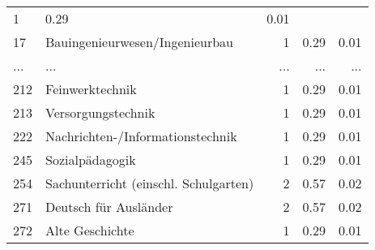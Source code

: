 \begin{longtable}{lXrrr}
          \num{1} &
          \num[round-mode=places,round-precision=2]{0,29} &
          \num[round-mode=places,round-precision=2]{0,01} \\
        17 & \multicolumn{1}{X}{Bauingenieurwesen/Ingenieurbau} & %
          \num{1} &
          \num[round-mode=places,round-precision=2]{0,29} &
          \num[round-mode=places,round-precision=2]{0,01} \\
       ... & ... & ... & ... & ... \\
        212 & \multicolumn{1}{X}{Feinwerktechnik} & %
          \num{1} &
          \num[round-mode=places,round-precision=2]{0,29} &
          \num[round-mode=places,round-precision=2]{0,01} \\

        213 & \multicolumn{1}{X}{Versorgungstechnik} & %
          \num{1} &
          \num[round-mode=places,round-precision=2]{0,29} &
          \num[round-mode=places,round-precision=2]{0,01} \\

        222 & \multicolumn{1}{X}{Nachrichten-/Informationstechnik} & %
          \num{1} &
          \num[round-mode=places,round-precision=2]{0,29} &
          \num[round-mode=places,round-precision=2]{0,01} \\

        245 & \multicolumn{1}{X}{Sozialpädagogik} & %
          \num{1} &
          \num[round-mode=places,round-precision=2]{0,29} &
          \num[round-mode=places,round-precision=2]{0,01} \\

        254 & \multicolumn{1}{X}{Sachunterricht (einschl. Schulgarten)} & %
          \num{2} &
          \num[round-mode=places,round-precision=2]{0,57} &
          \num[round-mode=places,round-precision=2]{0,02} \\

        271 & \multicolumn{1}{X}{Deutsch für Ausländer} & %
          \num{2} &
          \num[round-mode=places,round-precision=2]{0,57} &
          \num[round-mode=places,round-precision=2]{0,02} \\

        272 & \multicolumn{1}{X}{Alte Geschichte} & %
          \num{1} &
          \num[round-mode=places,round-precision=2]{0,29} &
          \num[round-mode=places,round-precision=2]{0,01} \\


\end{longtable}
